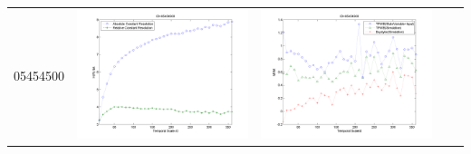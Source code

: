 \documentclass[11pt]{article}
\begin{document}
\begin{table}[H]
{\begin{tabular}{c  c   c   c  c }
05454500&\begin{minipage}{.4\textwidth}\includegraphics[width=\linewidth]{resultgraph/05454500e.png}\end{minipage}
&\begin{minipage}{.4\textwidth}\includegraphics[width=\linewidth]{resultgraph/05454500MI.png}\end{minipage}

\end{tabular}}
\end{table}
\end{document}
